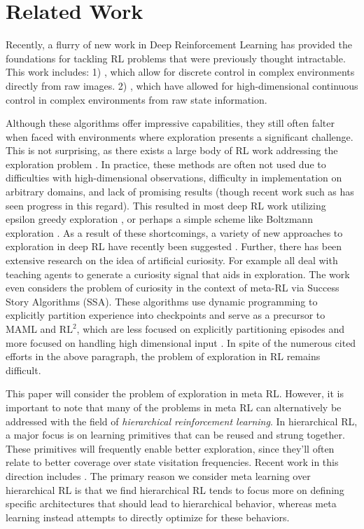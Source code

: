 \documentclass{article} %
\begin{document}
\section{Related Work} 
Recently, a flurry of new work in Deep Reinforcement Learning has provided the foundations for tackling RL problems that were previously thought intractable. This work includes: 1) \cite{dqn, a3c, sch1}, which allow for discrete control in complex environments directly from raw images. 2) \cite{trpo, a3c, ppo, ddpg}, which have allowed for high-dimensional continuous control in complex environments from raw state information. 


Although these algorithms offer impressive capabilities, they still often falter when faced with environments where exploration presents a significant challenge. This is not surprising, as there exists a large body of RL work addressing the exploration problem \citep{kearns, rmax, beb}. In practice, these methods are often not used due to difficulties with high-dimensional observations, difficulty in implementation on arbitrary domains, and lack of promising results (though recent work such as \cite{schex1} has seen progress in this regard). This resulted in most deep RL work utilizing epsilon greedy exploration \citep{dqn}, or perhaps a simple scheme like Boltzmann exploration \citep{boltzman}. As a result of these shortcomings, a variety of new approaches to exploration in deep RL have recently been suggested \citep{hash, vime, stadie, bootstrapdqn, countbased, countbased2}. Further, there has been extensive research on the idea of artificial curiosity. For example \cite{Ngo2012, Graziano2011, Schmidhuber1991, Schmidhuber2015, Storck1995, Sun2011} all deal with teaching agents to generate a curiosity signal that aids in exploration. The work \cite{schex2} even considers the problem of curiosity in the context of meta-RL via Success Story Algorithms (SSA). These algorithms use dynamic programming to explicitly partition experience into checkpoints and serve as a precursor to MAML and $\text{RL}^2$, which are less focused on explicitly partitioning episodes and more focused on handling high dimensional input \cite{schex3}. In spite of the numerous cited efforts in the above paragraph, the problem of exploration in RL remains difficult. 


This paper will consider the problem of exploration in meta RL. However, it is important to note that many of the problems in meta RL can alternatively be addressed with the field of \emph{hierarchical reinforcement learning}. In hierarchical RL, a major focus is on learning primitives that can be reused and strung together. These primitives will frequently enable better exploration, since they'll often relate to better coverage over state visitation frequencies. Recent work in this direction includes \citep{feudal, optioncritic, minecraft, progressive, hrlrev, schex4}. The primary reason we consider meta learning over hierarchical RL is that we find hierarchical RL tends to focus more on defining specific architectures that should lead to hierarchical behavior, whereas meta learning instead attempts to directly optimize for these behaviors. 
\end{document}

